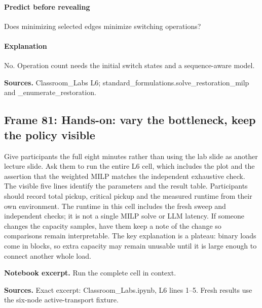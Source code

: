 \documentclass[11pt]{article}
\begin{document}
\paragraph{Predict before revealing}Does minimizing selected edges minimize switching operations?
\paragraph{Explanation}No. Operation count needs the initial switch states and a sequence-aware model.
\par\nopagebreak\begin{minipage}{\linewidth}{\footnotesize\color{slate}\textbf{Sources.} Classroom\_Labs L6; standard\_formulations.solve\_restoration\_milp and \_enumerate\_restoration.\par}\end{minipage}\par\medskip
\subsection*{Frame 81: Hands-on: vary the bottleneck, keep the policy visible}
Give participants the full eight minutes rather than using the lab slide as another lecture slide. Ask them to run the entire L6 cell, which includes the plot and the assertion that the weighted MILP matches the independent exhaustive check. The visible five lines identify the parameters and the result table. Participants should record total pickup, critical pickup and the measured runtime from their own environment. The runtime in this cell includes the fresh sweep and independent checks; it is not a single MILP solve or LLM latency. If someone changes the capacity samples, have them keep a note of the change so comparisons remain interpretable. The key explanation is a plateau: binary loads come in blocks, so extra capacity may remain unusable until it is large enough to connect another whole load.\par
\par\noindent\begin{minipage}{\linewidth}\textbf{Notebook excerpt.} Run the complete cell in context.\par \end{minipage}\par
\par\nopagebreak\begin{minipage}{\linewidth}{\footnotesize\color{slate}\textbf{Sources.} Exact excerpt: Classroom\_Labs.ipynb, L6 lines 1--5. Fresh results use the six-node active-transport fixture.\par}\end{minipage}\par\medskip
\end{document}
